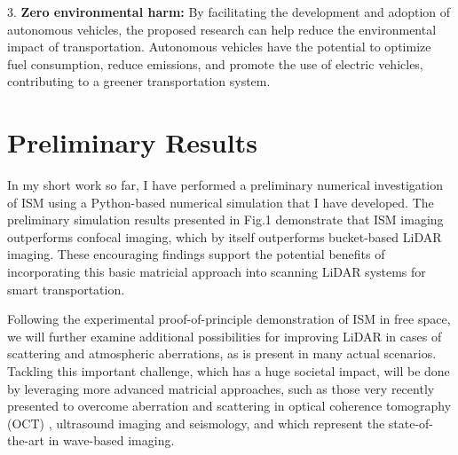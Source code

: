 \documentclass{article}
\begin{document}
3. \textbf{Zero environmental harm:} By facilitating the development and adoption of autonomous vehicles, the proposed research can help reduce the environmental impact of transportation. Autonomous vehicles have the potential to optimize fuel consumption, reduce emissions, and promote the use of electric vehicles, contributing to a greener transportation system.

\vspace{-0.5em}
\section{Preliminary Results}
In my short work so far, I have performed a preliminary numerical investigation of ISM using a Python-based numerical simulation that I have developed. 
The preliminary simulation results presented in Fig.1  demonstrate that ISM imaging outperforms confocal imaging, which by itself outperforms bucket-based LiDAR imaging. These encouraging findings support the potential benefits of incorporating this basic matricial approach into scanning LiDAR systems for smart transportation.

Following the experimental proof-of-principle demonstration of ISM in free space, we will further examine additional possibilities for improving LiDAR in cases of scattering and atmospheric aberrations, as is present in many actual scenarios. Tackling this important challenge, which has a huge societal impact, will be done by leveraging more advanced matricial approaches, such as those very recently presented to overcome aberration and scattering in optical coherence tomography (OCT) \cite{Badon2020}, ultrasound imaging \cite{PhysRevX.10.021048} and seismology\cite{2018JB016361}, and which represent the state-of-the-art in wave-based imaging.
\end{document}
